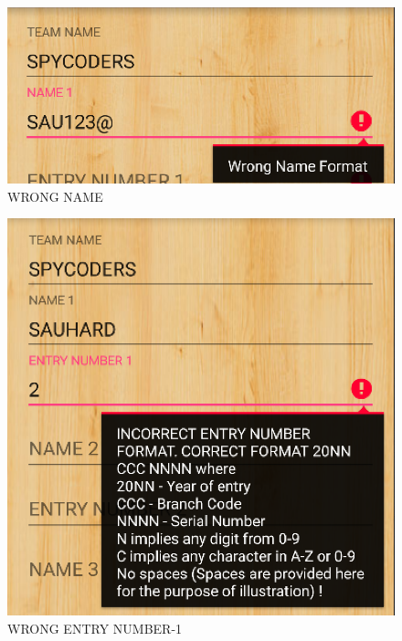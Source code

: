 \documentclass[12pt]{article}
\begin{document}
\begin{itemize}
\begin{enumerate}
\begin{enumerate}
        \end{enumerate}
        \end{enumerate}
        
	\begin{figure}
	\centering
	\includegraphics[scale=.7]{WRONG_NAME.png}
	\caption{WRONG NAME}
\end{figure}

	
	\begin{figure}
	\centering
	\includegraphics[scale=.7]{WRONG_ENTRY_NUM.png}
	\caption{WRONG ENTRY NUMBER-1}
\end{figure}


\end{itemize}
\end{document}
